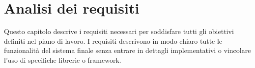 \chapter{Analisi dei requisiti}

Questo capitolo descrive i requisiti necessari per soddisfare tutti gli obiettivi definiti nel piano di lavoro.
I requisiti descrivono in modo chiaro tutte le funzionalità del sistema finale senza entrare in dettagli implementativi o vincolare l'uso di specifiche librerie o framework.
